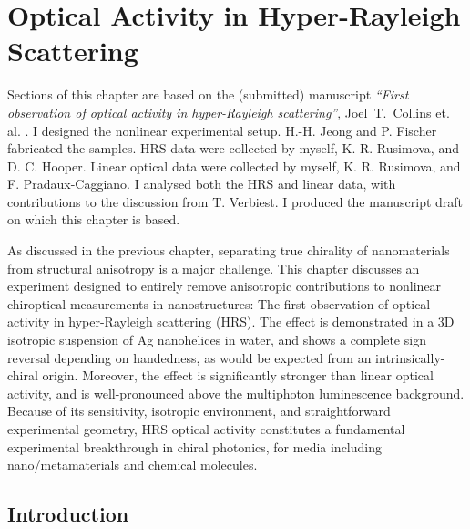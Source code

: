 \chapter{Optical Activity in Hyper-Rayleigh Scattering}\label{sec:results:HRS}

Sections of this chapter are based on the (submitted) manuscript \textit{``First observation of optical activity in hyper-Rayleigh scattering''}, Joel~T.~Collins et. al. \cite{Collins2018c}.
I designed the nonlinear experimental setup. H.-H. Jeong and P. Fischer fabricated the samples. HRS data were collected by myself, K. R. Rusimova, and D. C. Hooper. Linear optical data were collected by myself, K. R. Rusimova, and F. Pradaux-Caggiano. I analysed both the HRS and linear data, with contributions to the discussion from T. Verbiest. I produced the manuscript draft on which this chapter is based.

\bigskip \noindent
As discussed in the previous chapter, separating true chirality of nanomaterials from structural anisotropy is a major challenge. This chapter discusses an experiment designed to entirely remove anisotropic contributions to nonlinear chiroptical measurements in nanostructures: The first observation of optical activity in hyper-Rayleigh scattering (HRS). The effect is demonstrated in a 3D isotropic suspension of Ag nanohelices in water, and shows a complete sign reversal depending on handedness, as would be expected from an intrinsically-chiral origin. Moreover, the effect is significantly stronger than linear optical activity, and is well-pronounced above the multiphoton luminescence background. Because of its sensitivity, isotropic environment, and straightforward experimental geometry, HRS optical activity constitutes a fundamental experimental breakthrough in chiral photonics, for media including nano/metamaterials and chemical molecules. 


\section{Introduction}

